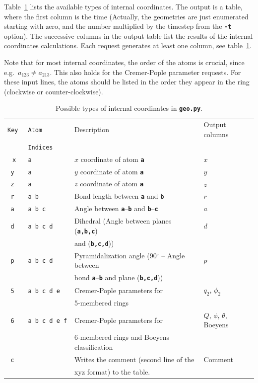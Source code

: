 \documentclass[a4paper,11pt,DIV=15,openany,twoside=false]{scrbook}
\newcommand{\ttt}[1]{\textbf{\texttt{#1}}}
\begin{document}
Table~\ref{tab:Geo_input} lists the available types of internal coordinates. The output is a table, where the first column is the time (Actually, the geometries are just enumerated starting with zero, and the number multiplied by the timestep from the \ttt{-t} option). The successive columns in the output table list the results of the internal coordinates calculations. Each request generates at least one column, see table~\ref{tab:Geo_input}. 

Note that for most internal coordinates, the order of the atoms is crucial, since e.g.\ $a_{123}\neq a_{213}$. This also holds for the Cremer-Pople parameter requests. For these input lines, the atoms should be listed in the order they appear in the ring (clockwise or counter-clockwise).

\begin{table}[h]
  \centering
  \caption{Possible types of internal coordinates in \ttt{geo.py}. }
  \label{tab:Geo_input}
  \begin{tabular}{>{\tt}c>{\tt}lll}
    \toprule
    \rmfamily Key         &\rmfamily Atom      &Description    &Output columns\\
                          &\rmfamily Indices   &               &\\
    \midrule
    x   &a              &$x$ coordinate of atom \ttt{a}         &$x$\\
    y   &a              &$y$ coordinate of atom \ttt{a}         &$y$\\
    z   &a              &$z$ coordinate of atom \ttt{a}         &$z$\\
    r   &a b            &Bond length between \ttt{a} and \ttt{b}        &$r$\\
    a   &a b c          &Angle between \ttt{a}--\ttt{b} and \ttt{b}--\ttt{c}         &$a$\\
    d   &a b c d        &Dihedral (Angle between planes (\ttt{a,b,c})    &$d$\\
                       &&and (\ttt{b,c,d}))&\\
    p   &a b c d        &Pyramidalization angle (90$^\circ$ -- Angle between    &$p$\\
                       &&bond \ttt{a}--\ttt{b} and plane (\ttt{b,c,d}))&\\
    5   &a b c d e      &Cremer-Pople parameters for &$q_2$, $\phi_2$\\
                       &&5-membered rings&\\
    6   &a b c d e f    &Cremer-Pople parameters for &$Q$, $\phi$, $\theta$, Boeyens\\
                       &&6-membered rings and Boeyens classification&\\
    c   &               &Writes the comment (second line of the &Comment\\
                       &&xyz format) to the table.&\\
    \bottomrule
  \end{tabular}
\end{table}
\end{document}
